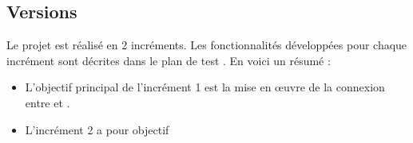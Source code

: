 \newpage
\subsection{Versions} %

Le projet \projectName est réalisé en 2 incréments. Les fonctionnalités développées pour chaque incrément sont décrites dans le plan de test \cite{PDT}. En voici un résumé :
\begin{itemize}
    \item L'objectif principal de l'incrément 1 est la mise en œuvre de la connexion entre \appAndroid et \appC. \complete
    \item L'incrément 2 a pour objectif \complete
\end{itemize}